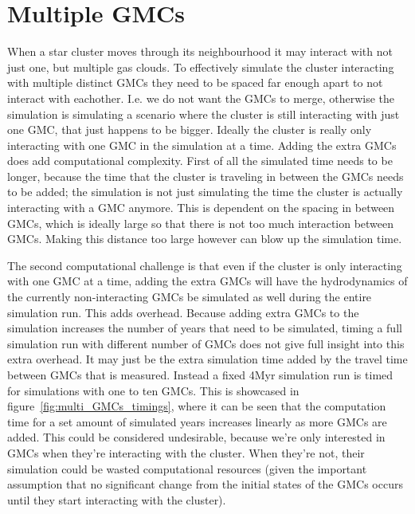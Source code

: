 \documentclass{aa}
\begin{document}
\section{Multiple GMCs}
When a star cluster moves through its neighbourhood it may interact with not just one, but multiple gas clouds. To effectively simulate the cluster interacting with multiple distinct GMCs they need to be spaced far enough apart to not interact with eachother. I.e. we do not want the GMCs to merge, otherwise the simulation is simulating a scenario where the cluster is still interacting with just one GMC, that just happens to be bigger. Ideally the cluster is really only interacting with one GMC in the simulation at a time. Adding the extra GMCs does add computational complexity. First of all the simulated time needs to be longer, because the time that the cluster is traveling in between the GMCs needs to be added; the simulation is not just simulating the time the cluster is actually interacting with a GMC anymore. This is dependent on the spacing in between GMCs, which is ideally large so that there is not too much interaction between GMCs. Making this distance too large however can blow up the simulation time.

The second computational challenge is that even if the cluster is only interacting with one GMC at a time, adding the extra GMCs will have the hydrodynamics of the currently non-interacting GMCs be simulated as well during the entire simulation run. This adds overhead. Because adding extra GMCs to the simulation increases the number of years that need to be simulated, timing a full simulation run with different number of GMCs does not give full insight into this extra overhead. It may just be the extra simulation time added by the travel time between GMCs that is measured. Instead a fixed 4Myr simulation run is timed for simulations with one to ten GMCs. This is showcased in figure~\ref{fig:multi_GMCs_timings}, where it can be seen that the computation time for a set amount of simulated years increases linearly as more GMCs are added. This could be considered undesirable, because we're only interested in GMCs when they're interacting with the cluster. When they're not, their simulation could be wasted computational resources (given the important assumption that no significant change from the initial states of the GMCs occurs until they start interacting with the cluster).
\end{document}
